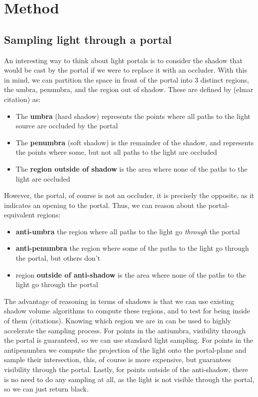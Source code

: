 \section{Method}
\label{sec:method}
 
\subsection*{Sampling light through a portal}

An interesting way to think about light portals is to consider the shadow that would be cast by the portal if we were to replace it with an occluder.  With this in mind, we can partition the space in front of the portal into 3 distinct regions, the umbra, penumbra, and the region out of shadow. These are defined by (elmar citation) as:

\begin{itemize}
  \item The \textbf{umbra} (hard shadow) represents the points where all paths to the light source are occluded by the portal
  \item The \textbf{penumbra} (soft shadow) is the remainder of the shadow, and represents the points where some, but not all paths to the light are occluded
  \item The \textbf{region outside of shadow}  is the area where none of the paths to the light are occluded
\end{itemize}

However, the portal, of course is not an occluder, it is precisely the opposite, as it indicates an opening to the portal. Thus, we can reason about the portal-equivalent regions:

\begin{itemize}
  \item \textbf{anti-umbra} the region where all paths to the light go \emph{through} the portal
  \item \textbf{anti-penumbra} the region where some of the paths to the light go through the portal, but others don't 
  \item region \textbf{outside of anti-shadow} is the area where none of the paths to the light go through the portal
\end{itemize}

The advantage of reasoning in terms of shadows is that we can use existing shadow volume algorithms to compute these regions, and to test for being inside of them (citations). Knowing which region we are in can be used to highly accelerate the sampling process. For points in the antiumbra, visibility through the portal is guaranteed, so we can use standard light sampling. For points in the antipenumbra we compute the projection of the light onto the portal-plane and sample their intersection, this, of course is more expensive, but guarantees visibility through the portal. Lastly, for points outside of the anti-shadow, there is no need to do any sampling at all, as the light is not visible through the portal, so we can just return black.